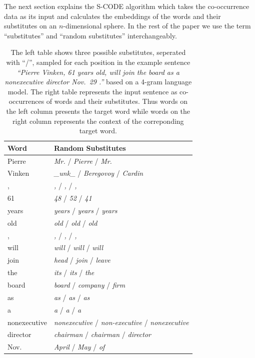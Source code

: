 The next section explains the S-CODE algorithm which takes the
co-occurrence data as its input and calculates the embeddings of the
words and their substitutes on an $n$-dimensional sphere.  In the rest
of the paper we use the term ``substitutes'' and ``random
substitutes'' interchangeably.

\begin{table}[ht]
\caption{The left table shows three possible substitutes, seperated
  with ``/'', sampled for each position in the example sentence
  \textit{``Pierre Vinken, 61 years old, will join the board as a
    nonexecutive director Nov.~29 .''} based on a 4-gram language
  model.  The right table represents the input sentence as
  co-occurrences of words and their substitutes.  Thus words on the
  left column presents the target word while words on the right column
  represents the context of the correponding target word.}
\begin{tabular}{|ll|} \hline
\textbf{Word} & \textbf{Random Substitutes}\\
\hline
Pierre & \textit{Mr.}  / \textit{Pierre} /  \textit{Mr.}\\
Vinken & \textit{\_unk\_} / \textit{Beregovoy} / \textit{Cardin}\\
, & \textit{,} / \textit{,} / \textit{,}\\
61 & \textit{48} / \textit{52} / \textit{41}\\
years & \textit{years} /  \textit{years} /  \textit{years}\\
old & \textit{old} /  \textit{old} /  \textit{old}\\
, & \textit{,} /  \textit{,} /  \textit{,}\\
will & \textit{will} /  \textit{will} /  \textit{will}\\
join & \textit{head} /  \textit{join} /  \textit{leave}\\
the  & \textit{its} /  \textit{its} /  \textit{the}\\
board & \textit{board} /  \textit{company} / \textit{firm}\\
as & \textit{as} / \textit{as} / \textit{as}\\
a & \textit{a} / \textit{a} / \textit{a}\\
nonexecutive & \textit{nonexecutive} / \textit{non-executive} / \textit{nonexecutive}\\
director & \textit{chairman} / \textit{chairman} / \textit{director}\\
Nov. & \textit{April} / \textit{May} / \textit{of}\\

\end{tabular}
\end{table}
